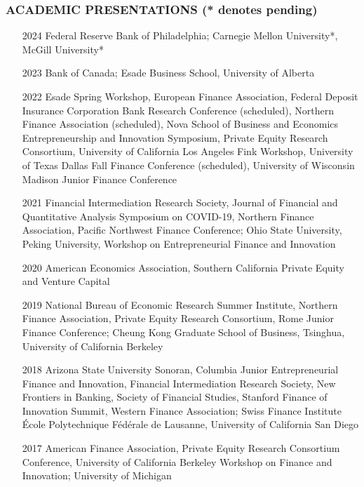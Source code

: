 \documentclass[11pt]{article}
\begin{document}
\subsubsection*{ACADEMIC PRESENTATIONS (* denotes pending)}
\begin{itemize}
    \item[2024] Federal Reserve Bank of Philadelphia; Carnegie Mellon University*, McGill University*

    \item[2023] Bank of Canada; Esade Business School, University of Alberta

    \item[2022] Esade Spring Workshop, European Finance Association, Federal Deposit Insurance Corporation Bank Research Conference (scheduled), Northern Finance Association (scheduled), Nova School of Business and Economics Entrepreneurship and Innovation Symposium, Private Equity Research Consortium, University of California Los Angeles Fink Workshop, University of Texas Dallas Fall Finance Conference (scheduled), University of Wisconsin Madison Junior Finance Conference

    \item[2021] Financial Intermediation Research Society, Journal of Financial and Quantitative Analysis Symposium on COVID-19, Northern Finance Association, Pacific Northwest Finance Conference; Ohio State University, Peking University, Workshop on Entrepreneurial Finance and Innovation

    \item[2020] American Economics Association, Southern California Private Equity and Venture Capital

    \item[2019] National Bureau of Economic Research Summer Institute, Northern Finance Association, Private Equity Research Consortium, Rome Junior Finance Conference; Cheung Kong Graduate School of Business, Tsinghua, University of California Berkeley

    \item[2018] Arizona State University Sonoran, Columbia Junior Entrepreneurial Finance and Innovation, Financial Intermediation Research Society, New Frontiers in Banking, Society of Financial Studies, Stanford Finance of Innovation Summit, Western Finance Association; Swiss Finance Institute École Polytechnique Fédérale de Lausanne, University of California San Diego

    \item[2017] American Finance Association, Private Equity Research Consortium Conference, University of California Berkeley Workshop on Finance and Innovation; University of Michigan


\end{itemize}
\end{document}
